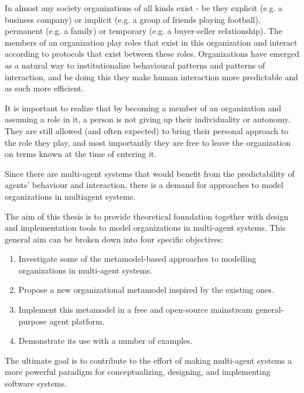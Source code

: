 In almost any society organizations of all kinds exist - be they explicit (e.g. a business company) or implicit (e.g. a group of friends playing football), permanent (e.g. a family) or temporary (e.g. a buyer-seller relationship).
The members of an organization play roles that exist in this organization and interact according to protocols that exist between these roles.
Organizations have emerged as a natural way to institutionalize behavioural patterns and patterns of interaction, and be doing this they make human interaction more predictable and as such more efficient.

It is important to realize that by becoming a member of an organization and assuming a role in it, a person is not giving up their individuality or autonomy.
They are still allowed (and often expected) to bring their personal approach to the role they play, and most importantly they are free to leave the organization on terms known at the time of entering it.

Since there are multi-agent systems that would benefit from the predictability of agents' behaviour and interaction, there is a demand for approaches to model organizations in multiagent systems.


The aim of this thesis is to provide theoretical foundation together with design and implementation tools to model organizations in multi-agent systems.
This general aim can be broken down into four specific objectives:
\begin{enumerate}
	\item Investigate some of the metamodel-based approaches to modelling organizations in multi-agent systems.
	\item Propose a new organizational metamodel inspired by the existing ones.
	\item Implement this metamodel in a free and open-source mainstream general-purpose agent platform.
	\item Demonstrate its use with a number of examples. 
\end{enumerate}
The ultimate goal is to contribute to the effort of making multi-agent systems a more powerful paradigm for conceptualizing, designing, and implementing software systems.


